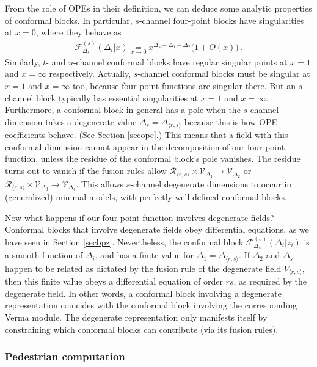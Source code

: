 \documentclass[12pt, a4paper, notitlepage, twoside]{report}
\numberwithin{equation}{section}
\theoremstyle{break}
\begin{document}
From the role of OPEs in their definition, we can deduce some analytic properties of conformal blocks. In particular, $s$-channel four-point blocks have singularities at $x=0$, where they behave as 
\begin{align}
 \mathcal{F}^{(s)}_{\Delta_s}(\Delta_i|x) \underset{x\to 0}{=} x^{\Delta_s-\Delta_1-\Delta_2}\Big( 1+ O(x)\Big)\ .
\end{align}
Similarly, $t$- and $u$-channel conformal blocks have regular singular points at $x=1$ and $x=\infty$ respectively. Actually, $s$-channel conformal blocks must be singular at $x=1$ and $x=\infty$ too, because four-point functions are singular there. But an $s$-channel block typically has essential singularities at $x=1$ and $x=\infty$. 
Furthermore, a conformal block in general has a pole when the $s$-channel dimension takes a degenerate value $\Delta_s=\Delta_{\langle r,s\rangle}$ because this is how OPE coefficients behave. (See Section \ref{secope}.) 
This means that a field with this conformal dimension cannot appear in the decomposition of our four-point function, unless the residue of the conformal block's pole vanishes. The residue turns out to vanish if the fusion rules allow $\mathcal{R}_{\langle r,s \rangle}\times \mathcal{V}_{\Delta_1}\to \mathcal{V}_{\Delta_2}$ or $\mathcal{R}_{\langle r,s \rangle}\times \mathcal{V}_{\Delta_3}\to \mathcal{V}_{\Delta_4}$. This allows $s$-channel degenerate dimensions to occur in  (generalized) minimal models, with perfectly well-defined conformal blocks.

Now what happens if our four-point function involves degenerate fields? Conformal blocks that involve degenerate fields obey differential equations, as we have seen in Section \ref{secbpz}.
Nevertheless, the conformal block $\mathcal{F}^{(s)}_{\Delta_s}(\Delta_i|z_i)$ is a smooth function of $\Delta_i$, and has a finite value for $\Delta_1 = \Delta_{\langle r,s\rangle}$. 
If $\Delta_2$ and $\Delta_s$ happen to be related as dictated by the fusion rule of the degenerate field $V_{\langle r,s\rangle}$, then this finite value obeys a differential equation of order $rs$, as required by the degenerate field.
In other words, a conformal block involving a degenerate representation coincides with the conformal block involving the corresponding Verma module.
The degenerate representation only manifests itself by constraining which conformal blocks can contribute (via its fusion rules).


\subsubsection{Pedestrian computation}
\end{document}
